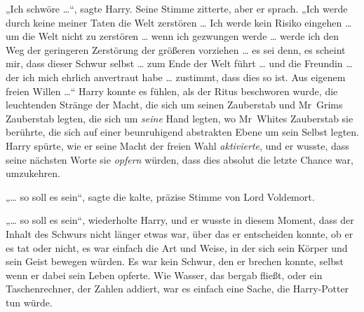 „Ich schwöre …“, sagte Harry.
Seine Stimme zitterte, aber er sprach.
„Ich werde durch keine meiner Taten die Welt zerstören … Ich werde kein Risiko eingehen … um die Welt nicht zu zerstören … wenn ich gezwungen werde … werde ich den Weg der geringeren Zerstörung der größeren vorziehen … es sei denn, es scheint mir, dass dieser Schwur selbst … zum Ende der Welt führt … und die Freundin … der ich mich ehrlich anvertraut habe … zustimmt, dass dies so ist. Aus eigenem freien Willen …“
Harry konnte es fühlen, als der Ritus beschworen wurde, die leuchtenden Stränge der Macht, die sich um seinen Zauberstab und Mr~Grims Zauberstab legten, die sich um \emph{seine} Hand legten, wo Mr~Whites Zauberstab sie berührte, die sich auf einer beunruhigend abstrakten Ebene um sein Selbst legten. Harry spürte, wie er seine Macht der freien Wahl \emph{aktivierte}, und er wusste, dass seine nächsten Worte sie \emph{opfern} würden, dass dies absolut die letzte Chance war, umzukehren.

„… so soll es sein“, sagte die kalte, präzise Stimme von Lord Voldemort.

„… so soll es sein“, wiederholte Harry, und er wusste in diesem Moment, dass der Inhalt des Schwurs nicht länger etwas war, über das er entscheiden konnte, ob er es tat oder nicht, es war einfach die Art und Weise, in der sich sein Körper und sein Geist bewegen würden. Es war kein Schwur, den er brechen konnte, selbst wenn er dabei sein Leben opferte. Wie Wasser, das bergab fließt, oder ein Taschenrechner, der Zahlen addiert, war es einfach eine Sache, die Harry-Potter tun würde.

